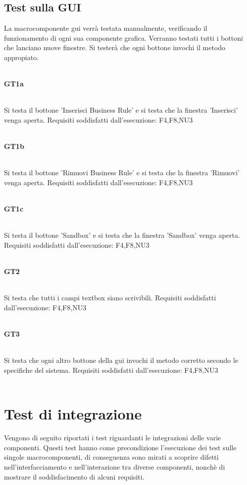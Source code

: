 \subsection{Test sulla GUI}
La macrocomponente gui verr\`a testata manualmente, verificando il funzionamento di ogni sua componente grafica. Verranno testati tutti i bottoni che lanciano nuove finestre. Si tester\`a che ogni bottone invochi il metodo appropiato.\\
\\
\begin{Large}\textbf{GT1a}\end{Large} \\
Si testa il bottone 'Inserisci Business Rule' e si testa che la finestra 'Inserisci' venga aperta.
Requisiti soddisfatti dall'esecuzione: F4,F8,NU3 \\
 \\
\begin{Large}\textbf{GT1b}\end{Large} \\
Si testa il bottone 'Rimuovi Business Rule' e si testa che la finestra 'Rimuovi' venga aperta.
Requisiti soddisfatti dall'esecuzione: F4,F8,NU3\\
 \\
\begin{Large}\textbf{GT1c}\end{Large} \\
Si testa il bottone 'Sandbox' e si testa che la finestra 'Sandbox' venga aperta.
Requisiti soddisfatti dall'esecuzione: F4,F8,NU3\\
 \\
\begin{Large}\textbf{GT2}\end{Large} \\
Si testa che tutti i campi textbox siano scrivibili.
Requisiti soddisfatti dall'esecuzione: F4,F8,NU3\\
 \\
\begin{Large}\textbf{GT3}\end{Large} \\
Si testa che ogni altro bottone della gui invochi il metodo corretto secondo le specifiche del sistema.
Requisiti soddisfatti dall'esecuzione: F4,F8,NU3\\
 \\
\section{Test di integrazione}
Vengono di seguito riportati i test riguardanti le integrazioni delle varie componenti. Questi test hanno come precondizione l'esecuzione dei test sulle singole macrocomponenti, di conseguenza sono mirati a scoprire difetti nell'interfacciamento e nell'interazione tra diverse componenti, nonch\`e di mostrare il soddisfacimento di alcuni requisiti.

